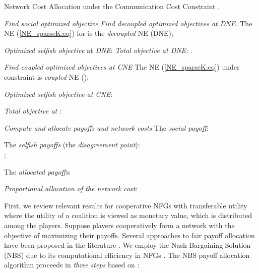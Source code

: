 \documentclass[12pt, draftclsnofoot,onecolumn]{IEEEtran}
\begin{document}
\begin{algorithm}[!b]
	 \caption{Network Cost Allocation under the Communication Cost Constraint .}
	 \label{alg3:alg}
	\begin{algorithmic}
	 {\it Find social optimized objective } 
	\Indent
\EndIndent
	 {\it Find decoupled optimized objectives at DNE.} 
	\Indent
	 {The NE (\ref{NE_sparseK:eq}) for  is the {\it decoupled} NE (DNE);}

	 {{\it Optimized selfish objective} at {\it DNE}:}
	 {{\it Total objective at DNE:} .}

	\EndIndent
	 {\it Find coupled optimized objectives at CNE}
	\Indent
	 {The NE (\ref{NE_sparseK:eq}) under constraint  is {\it coupled} NE ();}

	 {{\it Optimized selfish objective at CNE}:
	}

	 {{\it Total objective at }: }

	\EndIndent
	 {\it Compute and allocate payoffs and network costs} 
	\Indent
	 {The {\it social payoff}: }

	 {The {\it selfish payoffs} (the {\it disagreement point}):\\
	 ;}

     {The {\it allocated payoffs}:\\
     }

      {{\it Proportional allocation of the network cost}:\\ }
   
    \EndIndent
	 \end{algorithmic}
\end{algorithm}

First, we review relevant results for cooperative NFGs with transferable utility \cite{Peters2008} where the utility of a coalition is viewed as monetary value, which is distributed among the players. Suppose  players cooperatively form a network with the objective of maximizing their payoffs. Several approaches to fair payoff allocation have been proposed in the literature \cite{saad2009distributed,myerson1980conference,Avrachenkov2015265,kawamori2016nash}. We employ the Nash Bargaining Solution (NBS) due to its computational efficiency in NFGs \cite{Avrachenkov2015265,kawamori2016nash}. The NBS payoff allocation algorithm proceeds in {\it three steps} based on \cite{kawamori2016nash}: 
\end{document}
